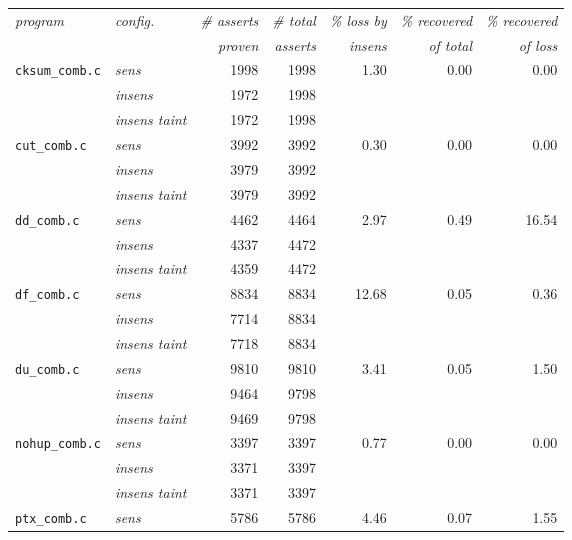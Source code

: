       \begin{figure}
        \centering
        \begin{tabular}{l|l||r|r||r|r|r}
          \textit{program} & \textit{config.} & \textit{\# asserts} & \textit{\# total} & \textit{\% loss by} & \textit{\% recovered} & \textit{\% recovered}\\
            &  & \textit{proven} & \textit{asserts} & \textit{insens} & \textit{of total} & \textit{of loss}\\
          \hline
          \texttt{cksum\_comb.c} & \textit{sens} & 1998 & 1998 & 1.30 & 0.00 & 0.00\\
          & \textit{insens} & 1972 & 1998 & & & \\
          & \textit{insens taint} & 1972 & 1998 & & & \\
          \hline
          \texttt{cut\_comb.c} & \textit{sens} & 3992 & 3992 & 0.30 & 0.00 & 0.00\\
          & \textit{insens} & 3979 & 3992 & & & \\
          & \textit{insens taint} & 3979 & 3992 & & & \\
          \hline
          \texttt{dd\_comb.c} & \textit{sens} & 4462 & 4464 & 2.97 & 0.49 & 16.54\\
          & \textit{insens} & 4337 & 4472 & & & \\
          & \textit{insens taint} & 4359 & 4472 & & & \\
          \hline          
          \texttt{df\_comb.c} & \textit{sens} & 8834 & 8834 & 12.68 & 0.05 & 0.36\\
          & \textit{insens} & 7714 & 8834 & & & \\
          & \textit{insens taint} & 7718 & 8834 & & & \\
          \hline         
          \texttt{du\_comb.c} & \textit{sens} & 9810 & 9810 & 3.41 & 0.05 & 1.50\\
          & \textit{insens} & 9464 & 9798 & & & \\
          & \textit{insens taint} & 9469 & 9798 & & & \\
          \hline         
          \texttt{nohup\_comb.c} & \textit{sens} & 3397 & 3397 & 0.77 & 0.00 & 0.00\\
          & \textit{insens} & 3371 & 3397 & & & \\
          & \textit{insens taint} & 3371 & 3397 & & & \\
          \hline         
          \texttt{ptx\_comb.c} & \textit{sens} & 5786 & 5786 & 4.46 & 0.07 & 1.55\\

\end{tabular}
\end{figure}
